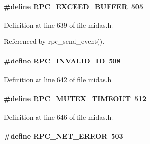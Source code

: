 \paragraph[{RPC\_\-EXCEED\_\-BUFFER}]{\setlength{\rightskip}{0pt plus 5cm}\#define RPC\_\-EXCEED\_\-BUFFER~505}\hfill\label{group__err25_ga1a35d5e05d16d9040eaad41c4434a20a}

\begin{DoxyItemize}
\item 
\end{DoxyItemize}

Definition at line 639 of file midas.h.

Referenced by rpc\_\-send\_\-event().
\paragraph[{RPC\_\-INVALID\_\-ID}]{\setlength{\rightskip}{0pt plus 5cm}\#define RPC\_\-INVALID\_\-ID~508}\hfill\label{group__err25_ga3cbff68ac5b5d52f692b8e880f9ef76c}

\begin{DoxyItemize}
\item 
\end{DoxyItemize}

Definition at line 642 of file midas.h.
\paragraph[{RPC\_\-MUTEX\_\-TIMEOUT}]{\setlength{\rightskip}{0pt plus 5cm}\#define RPC\_\-MUTEX\_\-TIMEOUT~512}\hfill\label{group__err25_gab7747c8b74d827488058ef9a0f9d3fc5}

\begin{DoxyItemize}
\item 
\end{DoxyItemize}

Definition at line 646 of file midas.h.
\paragraph[{RPC\_\-NET\_\-ERROR}]{\setlength{\rightskip}{0pt plus 5cm}\#define RPC\_\-NET\_\-ERROR~503}\hfill\label{group__err25_gae7db91aa77eeed4371ba30dfc122ded6}


